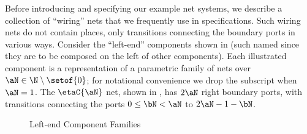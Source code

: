 Before introducing and specifying our example net systems, we describe a
collection of ``wiring'' nets that we frequently use in specifications. Such
wiring nets do not contain places, only transitions connecting the boundary
ports in various ways. Consider the ``left-end'' components shown in
 (such named since they are to be composed on the
left of other components). Each illustrated component is a representation of a
parametric family of nets over $\aN \in \N \setminus \setof{0}$; for notational
convenience we drop the subscript when $\aN = 1$. The $\etaC{\aN}$ net, shown
in , has $2\aN$ right boundary ports, with transitions
connecting the ports $0 \le \bN < \aN$ to $2\aN - 1 - \bN$.




\begin{figure}[ht]
\centering
\begin{subfigure}{0.33\textwidth}
\centering
\usebox\etaBox
\caption{\etaC{\aN} }
\label{fig:etaComponent}
\end{subfigure}%
\begin{subfigure}{0.33\textwidth}
\centering
\usebox\lendBox
\caption{\lendC{\aN} }
\label{fig:lendComponent}
\end{subfigure}%
\begin{subfigure}{0.33\textwidth}
\centering
\usebox\ltermBox
\caption{\ltermC{\aN} }
\label{fig:ltermComponent}
\end{subfigure}%
\caption{Left-end Component Families}
\label{fig:leftendComponents}
\end{figure}


